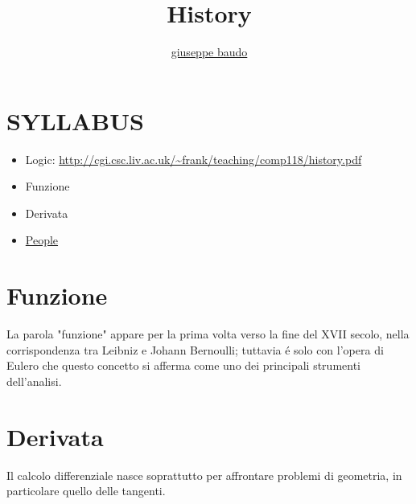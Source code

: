 \documentclass[a4paper,10pt]{article}
\title{History}
\author{\href{http://www.baudo.hol.es}{giuseppe baudo}}
\begin{document}
\maketitle

\section{SYLLABUS}
\begin{itemize}
 \item Logic: \url{http://cgi.csc.liv.ac.uk/~frank/teaching/comp118/history.pdf}
 \item Funzione
 \item Derivata
 \item \href{People.html}{People}
\end{itemize}

\section{Funzione}
La parola "funzione" appare per la prima volta verso la fine del XVII secolo, nella corrispondenza tra Leibniz e Johann Bernoulli; tuttavia \'{e} solo con l'opera di Eulero
che questo concetto si afferma come uno dei principali strumenti dell'analisi.

\section{Derivata}
Il calcolo differenziale nasce soprattutto per affrontare problemi di geometria, in particolare quello delle tangenti.
\end{document}
